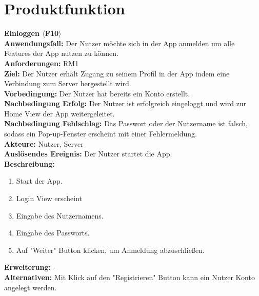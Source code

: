 \documentclass[parskip=full]{scrartcl}
\begin{document}
\section{Produktfunktion}
\textbf{Einloggen $\langle$F10$\rangle$}\\
\textbf{Anwendungsfall:} Der Nutzer möchte sich in der App anmelden um alle Features der App nutzen zu können.\\
\textbf{Anforderungen:} RM1\\
\textbf{Ziel:} Der Nutzer erhält Zugang zu seinem Profil in der App indem eine Verbindung zum Server hergestellt wird.\\
\textbf{Vorbedingung:} Der Nutzer hat bereits ein Konto erstellt.\\
\textbf{Nachbedingung Erfolg:} Der Nutzer ist erfolgreich eingeloggt und wird zur Home View der App weitergeleitet.\\
\textbf{Nachbedingung Fehlschlag:} Das Passwort oder der Nutzername ist falsch, sodass ein Pop-up-Fenster erscheint mit einer Fehlermeldung.\\
\textbf{Akteure:} Nutzer, Server\\
\textbf{Auslösendes Ereignis:} Der Nutzer startet die App.\\
\textbf{Beschreibung:}
\begin{enumerate}
    \item Start der App.
    \item Login View erscheint
    \item Eingabe des Nutzernamens.
    \item Eingabe des Passworts.
    \item Auf "Weiter" Button klicken, um Anmeldung abzuschließen.
\end{enumerate}
\textbf{Erweiterung:} -\\
\textbf{Alternativen:} Mit Klick auf den "Registrieren" Button kann ein Nutzer Konto angelegt werden.\\
\newpage
\end{document}
